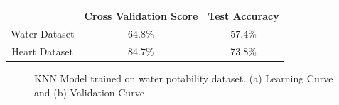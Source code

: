 \documentclass[
	letterpaper, %
]{mlreport}
\begin{document}
\begin{center}
	\begin{tabular}{|c||c|c|}
	 \hline
	  & Cross Validation Score & Test Accuracy \\
	 \hline\hline
	 Water Dataset & 64.8\%  & 57.4\% \\
	 \hline
	 Heart Dataset & 84.7\%  & 73.8\% \\
	 \hline
	\end{tabular}
	\label{table:table5}
\end{center}
\begin{figure}
	\centering
	\caption{KNN Model trained on water potability dataset. (a) Learning Curve and (b) Validation Curve}
	\label{fig:fig12}
\end{figure}
\end{document}
